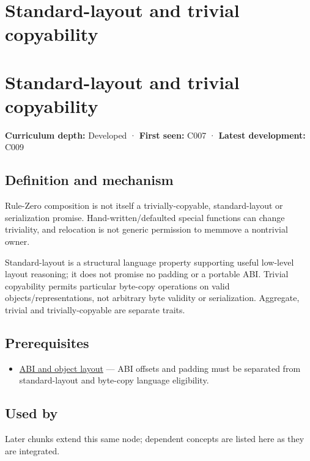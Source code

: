 \hypertarget{appendix-958870a64c53}{}
\section*{Standard-layout and trivial copyability}
\section{Standard-layout and trivial copyability}\label{standard-layout-and-trivial-copyability}

\textbf{Curriculum depth:} Developed · \textbf{First seen:} C007 · \textbf{Latest development:} C009

\subsection{Definition and mechanism}\label{definition-and-mechanism}

Rule-Zero composition is not itself a trivially-copyable, standard-layout or serialization promise. Hand-written/defaulted special functions can change triviality, and relocation is not generic permission to memmove a nontrivial owner.

Standard-layout is a structural language property supporting useful low-level layout reasoning; it does not promise no padding or a portable ABI. Trivial copyability permits particular byte-copy operations on valid objects/representations, not arbitrary byte validity or serialization. Aggregate, trivial and trivially-copyable are separate traits.

\subsection{Prerequisites}\label{prerequisites}

\begin{itemize}
\tightlist
\item
  \hyperref[appendix-c4ac6bb0fff8]{ABI and object layout} --- ABI offsets and padding must be separated from standard-layout and byte-copy language eligibility.
\end{itemize}

\subsection{Used by}\label{used-by}

Later chunks extend this same node; dependent concepts are listed here as they are integrated.

